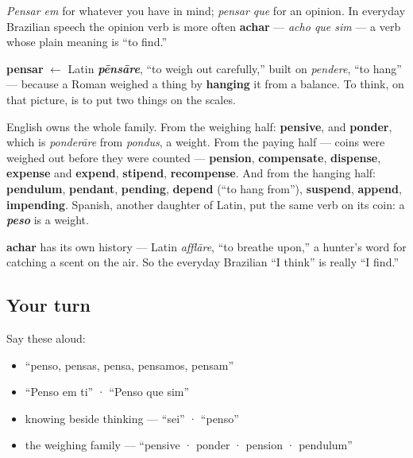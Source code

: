 \emph{Pensar em} for whatever you have in mind; \emph{pensar que} for an opinion. In everyday Brazilian speech the opinion verb is more often \textbf{achar} — \emph{acho que sim} — a verb whose plain meaning is \textquotedblleft{}to find.\textquotedblright{}

\begin{cousinweb}
\textbf{pensar} $\leftarrow$ Latin \emph{\textbf{pēnsāre}}, \textquotedblleft{}to weigh out carefully,\textquotedblright{} built on \emph{pendere}, \textquotedblleft{}to hang\textquotedblright{} — because a Roman weighed a thing by \textbf{hanging} it from a balance. To think, on that picture, is to put two things on the scales.

English owns the whole family. From the weighing half: \textbf{pensive}, and \textbf{ponder}, which is \emph{ponderāre} from \emph{pondus}, a weight. From the paying half — coins were weighed out before they were counted — \textbf{pension}, \textbf{compensate}, \textbf{dispense}, \textbf{expense} and \textbf{expend}, \textbf{stipend}, \textbf{recompense}. And from the hanging half: \textbf{pendulum}, \textbf{pendant}, \textbf{pending}, \textbf{depend} (\textquotedblleft{}to hang from\textquotedblright{}), \textbf{suspend}, \textbf{append}, \textbf{impending}. Spanish, another daughter of Latin, put the same verb on its coin: a \emph{\textbf{peso}} is a weight.

\textbf{achar} has its own history — Latin \emph{afflāre}, \textquotedblleft{}to breathe upon,\textquotedblright{} a hunter's word for catching a scent on the air. So the everyday Brazilian \textquotedblleft{}I think\textquotedblright{} is really \textquotedblleft{}I find.\textquotedblright{}
\end{cousinweb}

\subsection*{Your turn}
Say these aloud:

\begin{itemize}
\raggedright
  \item \textquotedblleft{}penso, pensas, pensa, pensamos, pensam\textquotedblright{}
  \item \textquotedblleft{}Penso em ti\textquotedblright{} · \textquotedblleft{}Penso que sim\textquotedblright{}
  \item knowing beside thinking — \textquotedblleft{}sei\textquotedblright{} · \textquotedblleft{}penso\textquotedblright{}
  \item the weighing family — \textquotedblleft{}pensive · ponder · pension · pendulum\textquotedblright{}
\end{itemize}

